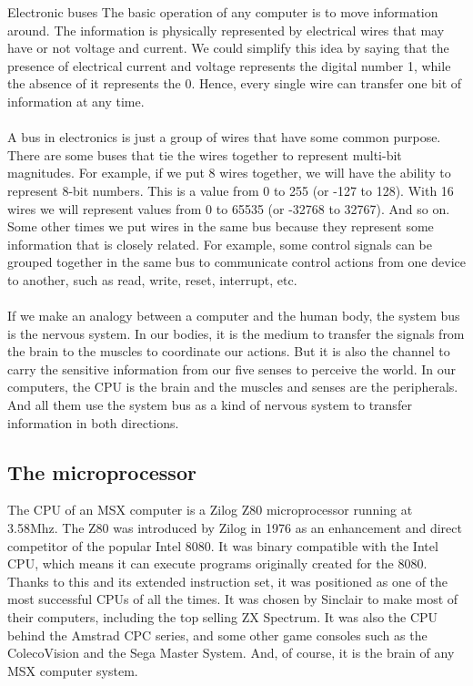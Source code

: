 \begin{theory}{Electronic buses}
	The basic operation of any computer is to move information around. The information is physically represented by electrical wires that may have or not voltage and current. We could simplify this idea by saying that the presence of electrical current and voltage represents the digital number 1, while the absence of it represents the 0. Hence, every single wire can transfer one bit of information at any time.\\\\
	
	A bus in electronics is just a group of wires that have some common purpose. There are some buses that tie the wires together to represent multi-bit magnitudes. For example, if we put 8 wires together, we will have the ability to represent 8-bit numbers. This is a value from 0 to 255 (or -127 to 128). With 16 wires we will represent values from 0 to 65535 (or -32768 to 32767). And so on. Some other times we put wires in the same bus because they represent some information that is closely related. For example, some control signals can be grouped together in the same bus to communicate control actions from one device to another, such as read, write, reset, interrupt, etc.\\\\
	
	If we make an analogy between a computer and the human body, the system bus is the nervous system. In our bodies, it is the medium to transfer the signals from the brain to the muscles to coordinate our actions. But it is also the channel to carry the sensitive information from our five senses to perceive the world. In our computers, the CPU is the brain and the muscles and senses are the peripherals. And all them use the system bus as a kind of nervous system to transfer information in both directions.
\end{theory}

\subsection{The microprocessor}

The CPU of an MSX computer is a Zilog Z80 microprocessor running at 3.58Mhz. The Z80 was introduced by Zilog in 1976 as an enhancement and direct competitor of the popular Intel 8080. It was binary compatible with the Intel CPU, which means it can execute programs originally created for the 8080. Thanks to this and its extended instruction set, it was positioned as one of the most successful CPUs of all the times. It was chosen by Sinclair to make most of their computers, including the top selling ZX Spectrum. It was also the CPU behind the Amstrad CPC series, and some other game consoles such as the ColecoVision and the Sega Master System. And, of course, it is the brain of any MSX computer system. 

